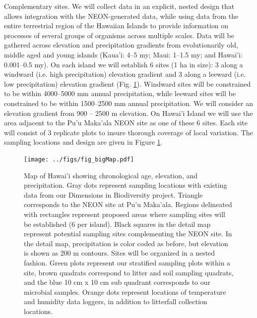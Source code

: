 \documentclass[11pt]{article}
\makeatletter
\renewcommand{\paragraph}{\@startsection{paragraph}{4}{\z@}
  {1ex \@plus 1ex \@minus .2ex}{-1em}
  {\normalfont\normalsize\it}
}
\makeatother
\begin{document}
\paragraph{Complementary sites.}
We will collect data in an explicit, nested design that allows
integration with the NEON-generated data, while using data from the
entire terrestrial region of the Hawaiian Islands to provide
information on processes of several groups of organisms across
multiple scales. Data will be gathered across elevation and
precipitation gradients from evolutionarily old, middle aged and young
islands (Kaua'i: 4--5 my; Maui: 1--1.5 my; and Hawai'i: 0.001--0.5
my).  On each island we will establish 6 sites (1 ha in size): 3 along
a windward (i.e. high precipitation) elevation gradient and 3 along a
leeward (i.e. low precipitation) elevation gradient
(Fig. \ref{fig:map}).  Windward sites will be constrained to be within
4000--5000 mm annual precipitation, while leeward sites will be
constrained to be within 1500--2500 mm annual precipitation.  We will
consider an elevation gradient from 900 -- 2500 m elevation.  On
Hawai'i Island we will use the area adjacent to the Pu'u Maka'ala NEON
site as one of these 6 sites.  Each site will consist of 3 replicate
plots to insure thorough coverage of local variation. The sampling
locations and design are given in Figure \ref{fig:map}.


\begin{figure}[!htb]
  \centering
  \texttt{[image: ../figs/fig\_bigMap.pdf]}
  \caption{Map of Hawai'i showing chronological age, elevation, and
    precipitation.  Gray dots represent sampling locations with
    existing data from our Dimensions in Biodiversity project.
    Triangle corresponds to the NEON site at Pu'u Maka'ala.  Regions
    delineated with rectangles represent proposed areas where sampling
    sites will be established (6 per island). Black squares in the
    detail map represent potential sampling sites complementing the
    NEON site.  In the detail map, precipitation is color coded as
    before, but elevation is shown as 200 m contours. Sites will be
    organized in a nested fashion.  Green plots represent our
    stratified sampling plots within a site, brown quadrats correspond
    to litter and soil sampling quadrats, and the blue 10 cm x 10 cm
    sub quadrant corresponds to our microbial samples.  Orange dots
    represent locations of temperature and humidity data loggers, in
    addition to litterfall collection locations.}
  \label{fig:map}
\end{figure}
\end{document}
